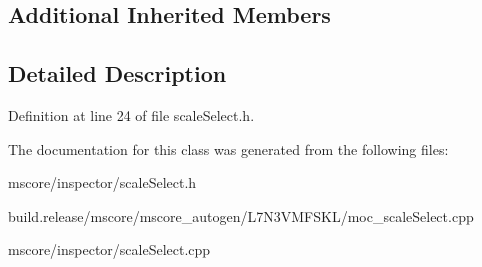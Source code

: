\subsection*{Additional Inherited Members}


\subsection{Detailed Description}


Definition at line 24 of file scale\+Select.\+h.



The documentation for this class was generated from the following files\+:\begin{DoxyCompactItemize}
\item 
mscore/inspector/scale\+Select.\+h\item 
build.\+release/mscore/mscore\+\_\+autogen/\+L7\+N3\+V\+M\+F\+S\+K\+L/moc\+\_\+scale\+Select.\+cpp\item 
mscore/inspector/scale\+Select.\+cpp\end{DoxyCompactItemize}
